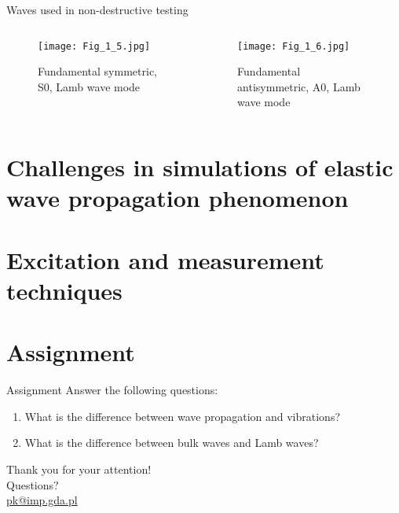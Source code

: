 \documentclass[10pt,aspectratio=169,notes]{beamer} %
\begin{document}
\begin{frame}{Waves used in non-destructive testing}
\begin{columns}[T]
	\begin{column}{0.5\textwidth}
		\begin{figure}
		\texttt{[image: Fig\_1\_5.jpg]}
		\caption{Fundamental symmetric, S0, \alert{Lamb wave} mode }	
		\end{figure}
	\end{column}
	\begin{column}{0.5\textwidth}
		\begin{figure}
		\texttt{[image: Fig\_1\_6.jpg]}
		\caption{Fundamental antisymmetric, A0, \alert{Lamb wave} mode }
		\end{figure}
	\end{column}
\end{columns}	
\end{frame}
\note{
	
}
\section{Challenges in simulations of elastic wave propagation phenomenon}
\section{Excitation and measurement techniques}
\section{Assignment}
\begin{frame}{Assignment}
Answer the following questions:
\begin{enumerate}	
  \item What is the difference between wave propagation and vibrations?
  \item What is the difference between bulk waves and Lamb waves?
\end{enumerate}
\end{frame}
\note{
}
{
\begin{frame}[standout]
  Thank you for your attention!\\ \vspace{12pt}
  Questions?\\ \vspace{12pt}
  \url{pk@imp.gda.pl}
\end{frame}
}
\end{document}
